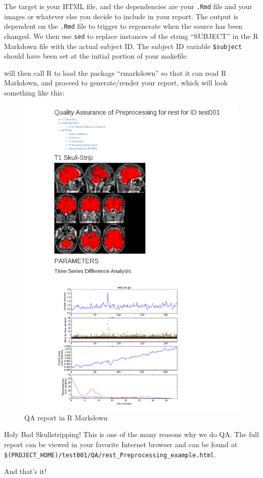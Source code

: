 The target is your HTML file, and the dependencies are your \texttt{.Rmd} file and your images or whatever else you decide to include in your report. The output is dependent on the \texttt{.Rmd} file to trigger to regenerate when the source has been changed. We then use \texttt{sed} to replace instances of the string ``SUBJECT'' in the R Markdown file with the actual subject ID. The subject ID variable \texttt{\$subject} should have been set at the initial portion of your makefile. 

\maken{} will then call R to load the package ``rmarkdown'' so that it can read R Markdown, and proceed to generate/render your report, which will look something like this: 

\begin{figure}
	\begin{center}
		\includegraphics[scale=.6]{images/QAcropped.png}
		\caption{QA report in R Markdown}
	\end{center}
\end{figure}

Holy Bad Skullstripping! This is one of the many reasons why we do QA. The full report can be viewed in your favorite Internet browser and can be found at \texttt{\$(PROJECT\_HOME)/test001/QA/rest\_Preprocessing\_example.html}. 
 
And that's it! 





